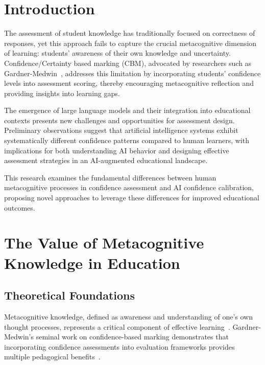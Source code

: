 \documentclass[sigconf]{acmart}
\begin{document}
\maketitle

\section{Introduction}

The assessment of student knowledge has traditionally focused on correctness of responses, yet this approach fails to capture the crucial metacognitive dimension of learning: students' awareness of their own knowledge and uncertainty. Confidence/Certainty based marking (CBM), advocated by researchers such as Gardner-Medwin~\cite{gardner2006confidence}, addresses this limitation by incorporating students' confidence levels into assessment scoring, thereby encouraging metacognitive reflection and providing insights into learning gaps.




The emergence of large language models and their integration into educational contexts presents new challenges and opportunities for assessment design. Preliminary observations suggest that artificial intelligence systems exhibit systematically different confidence patterns compared to human learners, with implications for both understanding AI behavior and designing effective assessment strategies in an AI-augmented educational landscape.

This research examines the fundamental differences between human metacognitive processes in confidence assessment and AI confidence calibration, proposing novel approaches to leverage these differences for improved educational outcomes.

\section{The Value of Metacognitive Knowledge in Education}

\subsection{Theoretical Foundations}

Metacognitive knowledge, defined as awareness and understanding of one's own thought processes, represents a critical component of effective learning~\cite{flavell1976metacognitive}. Gardner-Medwin's seminal work on confidence-based marking demonstrates that incorporating confidence assessments into evaluation frameworks provides multiple pedagogical benefits~\cite{gardner2006confidence, gardner2011learning}.
\end{document}
